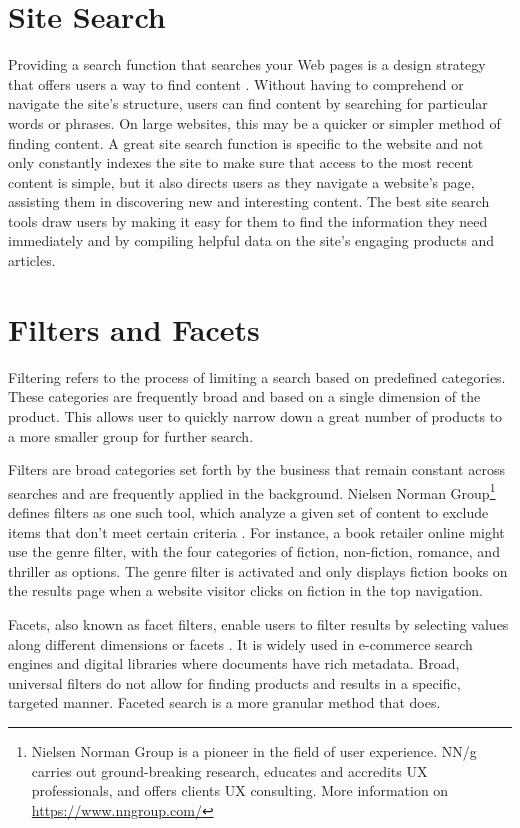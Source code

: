 \section{Site Search}
Providing a search function that searches your Web pages is a design strategy that offers users a way to find content \autocite{w3c2016search}. Without having to comprehend or navigate the site's structure, users can find content by searching for particular words or phrases. On large websites, this may be a quicker or simpler method of finding content. A great site search function is specific to the website and not only constantly indexes the site to make sure that access to the most recent content is simple, but it also directs users as they navigate a website's page, assisting them in discovering new and interesting content. The best site search tools draw users by making it easy for them to find the information they need immediately and by compiling helpful data on the site's engaging products and articles.


\section{Filters and Facets}
\label{filters_and_facets}
Filtering refers to the process of limiting a search based on predefined categories. These categories are frequently broad and based on a single dimension of the product. This allows user to quickly narrow down a great number of products to a more smaller group for further search.

Filters are broad categories set forth by the business that remain constant across searches and are frequently applied in the background. Nielsen Norman Group\footnote{Nielsen Norman Group is a pioneer in the field of user experience. NN/g carries out ground-breaking research, educates and accredits UX professionals, and offers clients UX consulting. More information on \url{https://www.nngroup.com/}} defines filters as one such tool, which analyze a given set of content to exclude items that don't meet certain criteria \autocite{whitenton2014filters}. For instance, a book retailer online might use the genre filter, with the four categories of fiction, non-fiction, romance, and thriller as options. The genre filter is activated and only displays fiction books on the results page when a website visitor clicks on fiction in the top navigation.

Facets, also known as facet filters, enable users to filter results by selecting values along different dimensions or facets \autocite{qu2021study}. It is widely used in e-commerce search engines and digital libraries where documents have rich metadata. Broad, universal filters do not allow for finding products and results in a specific, targeted manner. Faceted search is a more granular method that does.

